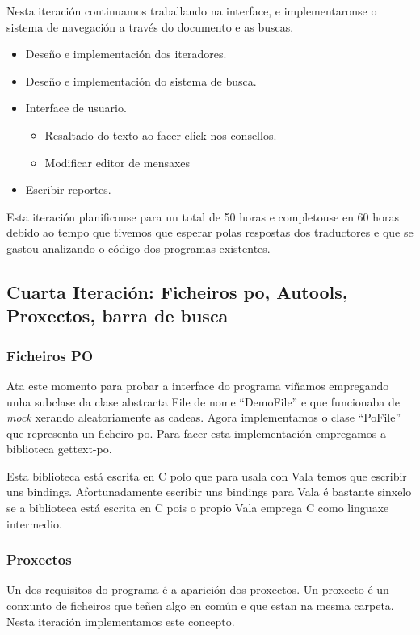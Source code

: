 Nesta iteración continuamos traballando na interface, e implementaronse o sistema de navegación a través do documento e as buscas.

\begin{itemize}
  \item Deseño e implementación dos iteradores.
  \item Deseño e implementación do sistema de busca.
  \item Interface de usuario.
    \begin{itemize}
      \item Resaltado do texto ao facer click nos consellos.
      \item Modificar editor de mensaxes
    \end {itemize}
  \item Escribir reportes.
\end{itemize}

Esta iteración planificouse para un total de 50 horas e completouse en 60 horas debido ao tempo que tivemos que esperar polas respostas dos traductores e que se gastou analizando o código dos programas existentes.


\subsection{Cuarta Iteración: Ficheiros po, Autools, Proxectos, barra de busca}

\subsubsection{Ficheiros PO}
Ata este momento para probar a interface do programa viñamos empregando unha subclase da clase abstracta File de nome ``DemoFile'' e que funcionaba de \emph{mock} xerando aleatoriamente as cadeas. Agora implementamos o clase ``PoFile'' que representa un ficheiro po. Para facer esta implementación empregamos a biblioteca gettext-po.

Esta biblioteca está escrita en C polo que para usala con Vala temos que escribir uns bindings. Afortunadamente escribir uns bindings para Vala é bastante sinxelo se a biblioteca está escrita en C pois o propio Vala emprega C como linguaxe intermedio.

\subsubsection{Proxectos}
Un dos requisitos do programa é a aparición dos proxectos. Un proxecto é un conxunto de ficheiros que teñen algo en común e que estan na mesma carpeta. Nesta iteración implementamos este concepto.

